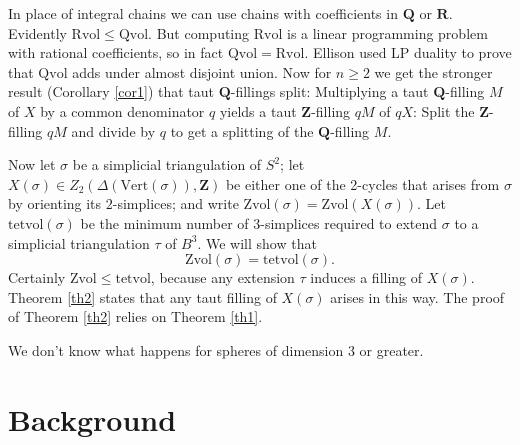 \documentclass[12pt]{article}
\def\ZZ{\mathbf{Z}}
\def\QQ{\mathbf{Q}}
\def\RR{\mathbf{R}}
\def\del{\partial}
\newcommand{\kw}{\mathrm}
\newcommand{\vertices}{\kw{Vert}}
\newcommand{\Zvol}{\kw{Zvol}}
\newcommand{\Qvol}{\kw{Qvol}}
\newcommand{\Rvol}{\kw{Rvol}}
\newcommand{\tetvol}{\kw{tetvol}}
\begin{document}
In place of integral chains we can use chains with
coefficients in $\QQ$ or $\RR$.
Evidently $\Rvol \leq \Qvol$.
But computing $\Rvol$ is
a linear programming problem with rational coefficients,
so in fact $\Qvol = \Rvol$.
Ellison used LP duality to prove that
$\Qvol$ adds under almost
disjoint union.
Now for $n \geq 2$ we get the stronger result
(Corollary \ref{cor1})
that taut $\QQ$-fillings split:
Multiplying a taut
$\QQ$-filling $M$ of $X$ by a common denominator $q$
yields a taut $\ZZ$-filling $qM$ of $qX$:
Split the $\ZZ$-filling $qM$ and divide by $q$ to get a splitting
of the $\QQ$-filling $M$.

Now let $\sigma$ be a simplicial triangulation of $S^2$;
let $X(\sigma) \in Z_2(\Delta(\vertices(\sigma)),\ZZ)$
be either one of the 2-cycles
that arises from $\sigma$ by orienting its $2$-simplices;
and write $\Zvol(\sigma) = \Zvol(X(\sigma))$.
Let $\tetvol(\sigma)$ be the minimum number of $3$-simplices
required to extend $\sigma$ to a simplicial triangulation $\tau$ of $B^3$.
We will show that
\[
\Zvol(\sigma) = \tetvol(\sigma)
.
\]
Certainly $\Zvol \leq \tetvol$,
because any extension $\tau$ induces a filling
of $X(\sigma)$.
Theorem \ref{th2} states that 
any taut filling of $X(\sigma)$ arises in this way.
The proof of Theorem \ref{th2} relies on Theorem \ref{th1}.

We don't know what happens for spheres of dimension 3 or greater.

\section{Background}
\end{document}
